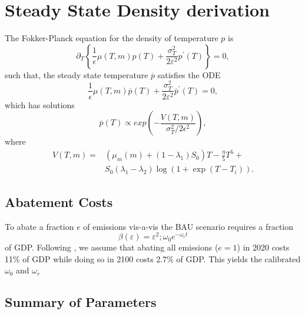 \documentclass[../../main.tex]{subfiles}
\begin{document}
\section{Steady State Density derivation} \label{appendix:density}

The Fokker-Planck equation for the density of temperature $p$ is \begin{equation}
    \partial_T \left\{ \frac{1}{\epsilon} \mu(T, m) p(T) + \frac{\sigma^2_T}{2\varepsilon^2} p^\prime(T) \right\} = 0,
\end{equation} such that, the steady state temperature $\overline{p}$ satisfies the ODE \begin{equation}
    \frac{1}{\epsilon} \mu(T, m) \overline{p}(T) + \frac{\sigma^2_T}{2\varepsilon^2} \overline{p}^\prime(T) = 0,
\end{equation} which has solutions \begin{equation}
    \overline{p}(T) \propto exp\left( -\frac{V(T, m)}{\sigma^2_T / 2\epsilon^2} \right), 
\end{equation} where \begin{equation}
    \begin{split}
        V(T, m) = &(\mu_m(m) + (1 - \lambda_1)S_0) T - \frac{\eta}{5} T^5 + \\
        &S_0 (\lambda_1 - \lambda_2) \log(1 + \exp(T - T_i)).
    \end{split}
\end{equation}


\subsection{Abatement Costs}

To abate a fraction $e$ of emissions vis-a-vis the BAU scenario requires a fraction \begin{equation}
    \beta(\varepsilon) = \varepsilon^2 
    ; \omega_0 e^{-\omega_r t}
\end{equation} of GDP. Following \citep{nordhaus_revisiting_2017}, we assume that abating all emissions ($e = 1$) in 2020 costs 11\% of GDP while doing so in 2100 costs 2.7\% of GDP. This yields the calibrated $\omega_0$ and $\omega_r$

\subsection{Summary of Parameters}
\end{document}
